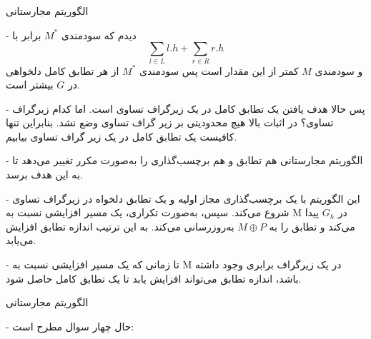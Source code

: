 \begin{itemframe}{الگوریتم مجارستانی}
\item[-]
دیدم که سودمندی $M^\ast$ برابر با
$$
\sum_{l \in L} l.h + \sum_{r \in R} r.h
$$
و سودمندی $M$ کمتر از این مقدار است پس سودمندی $M^\ast$ از هر تطابق کامل دلخواهی در $G‌$ بیشتر است.
\item[-]
پس حالا هدف یافتن یک تطابق کامل در یک زیرگراف تساوی است. اما کدام زیرگراف تساوی؟ در اثبات بالا هیچ محدودیتی بر زیر گراف تساوی وضع نشد. بنابراین تنها کافیست یک تطابق کامل در یک زیر گراف تساوی بیابیم.

\item[-]
الگوریتم مجارستانی هم تطابق و هم برچسب‌گذاری را به‌صورت مکرر تغییر می‌دهد تا به این هدف برسد.
\item[-]
این الگوریتم با یک برچسب‌گذاری مجاز اولیه و یک تطابق دلخواه در زیرگراف تساوی شروع می‌کند. سپس، به‌صورت تکراری، یک مسیر افزایشی نسبت به  M در $G_h$ پیدا می‌کند و تطابق را به $M \oplus P$ به‌روزرسانی می‌کند. به این ترتیب اندازه تطابق افزایش می‌یابد.
\item[-]
تا زمانی که یک مسیر افزایشی نسبت به M در یک زیرگراف برابری وجود داشته باشد، اندازه تطابق می‌تواند افزایش یابد تا یک تطابق کامل حاصل شود.
\end{itemframe}


\begin{itemframe}{الگوریتم مجارستانی}
\item[-]
حال چهار سوال مطرح است:

\end{itemframe}